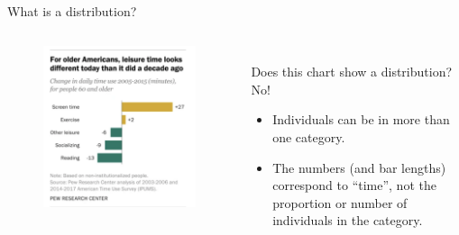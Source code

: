 \documentclass[aspectratio=169]{../latex_main/tntbeamer}  %
\begin{document}
	
	\begin{frame}{What is a distribution?}
	    \vspace{-1em}
	    \begin{columns}
	        \begin{column}{.4\textwidth}
	        
	              \begin{figure}
	                  \includegraphics[scale=.49]{Bild18}
	               \end{figure} 
	               
	        \end{column}
	        
	        \begin{column}{.6\textwidth}
	           
	              \\Does this chart show a distribution?\\
	              \bigskip
                    \pause
	              No!
	              \begin{itemize}
	                  \item Individuals can be in more than one category.
	                  \item The numbers (and bar lengths) correspond to ``time'', not the proportion or number of individuals in the category.
	              \end{itemize}
	              
	        \end{column}
	        
	    \end{columns}
	\end{frame}
	
\end{document}

